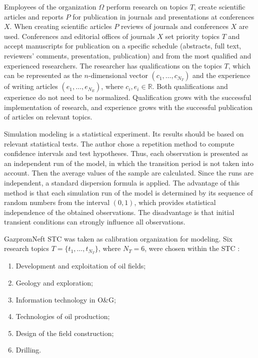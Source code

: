 \documentclass[12pt]{report}
\theoremstyle{definition}
\providecommand{\tightlist}{%
	\setlength{\itemsep}{0pt}\setlength{\parskip}{0pt}}
\begin{document}
Employees of the organization $\Omega$ perform research on topics $T$, create scientific articles and reports $P$ for publication in journals and presentations at conferences $X$.
When creating scientific articles $P$ reviews of journals and conferences $X$ are used.
Conferences and editorial offices of journals $X$ set priority topics $T$ and accept manuscripts for publication on a specific schedule (abstracts, full text, reviewers' comments, presentation, publication) and from the most qualified and experienced researchers.
The researcher has qualifications on the topics $T$, which can be represented as the $n$-dimensional vector $(c_1, \dots , c_{N_T} )$ and the experience of writing articles $(e_1 , \dots , e_{N_E} )$, where $c_i,e_i \in \mathbb{R}$. 
Both qualifications and experience do not need to be normalized. 
Qualification grows with the successful implementation of research, and experience grows with the successful publication of articles on relevant topics.

Simulation modeling is a statistical experiment. 
Its results should be based on relevant statistical tests. 
The author chose a repetition method to compute confidence intervals and test hypotheses.
Thus, each observation is presented as an independent run of the model, in which the transition period is not taken into account.
Then the average values of the sample are calculated. 
Since the runs are independent, a standard dispersion formula is applied.
The advantage of this method is that each simulation run of the model is determined by its sequence of random numbers from the interval $\left(0, 1\right)$, which provides statistical independence of the obtained observations. 
The disadvantage is that initial transient conditions can strongly influence all observations.

GazpromNeft STC was taken as calibration organization for modeling. 
Six research topics $T = \{ t_1, \dots , t_{N_T} \} $, where $N_T = 6 $, were chosen within the STC :
	
\begin{enumerate}
	\tightlist
	\item Development and exploitation of oil fields;
	\item Geology and exploration;
	\item Information technology in O\&G;
	\item Technologies of oil production;
	\item Design of the field construction;
	\item Drilling.	
\end{enumerate}	
\end{document}
